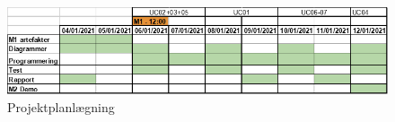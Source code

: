 \begin{figure}[htp] %
    \centering
    \includegraphics[width=14cm]{Report/figures/Projektplanlægning/Projektplanlægning.png}
    \caption{Projektplanlægning}
    \label{Projektplanlægning01}
\end{figure}